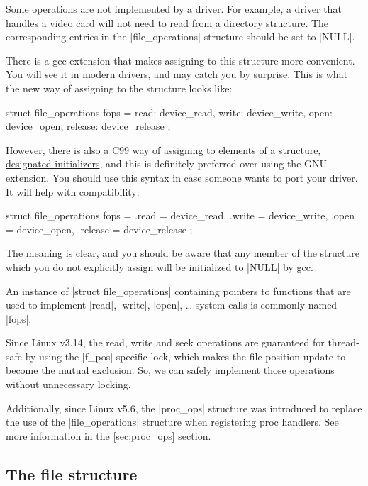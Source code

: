 \documentclass[10pt, oneside]{book}
\begin{document}
Some operations are not implemented by a driver.
For example, a driver that handles a video card will not need to read from a directory structure.
The corresponding entries in the \cpp|file_operations| structure should be set to \cpp|NULL|.

There is a gcc extension that makes assigning to this structure more convenient.
You will see it in modern drivers, and may catch you by surprise.
This is what the new way of assigning to the structure looks like:

\begin{code}
struct file_operations fops = {
	read: device_read,
	write: device_write,
	open: device_open,
	release: device_release
};
\end{code}

However, there is also a C99 way of assigning to elements of a structure, \href{https://gcc.gnu.org/onlinedocs/gcc/Designated-Inits.html}{designated initializers}, and this is definitely preferred over using the GNU extension.
You should use this syntax in case someone wants to port your driver.
It will help with compatibility:

\begin{code}
struct file_operations fops = {
	.read = device_read,
	.write = device_write,
	.open = device_open,
	.release = device_release
};
\end{code}

The meaning is clear, and you should be aware that any member of the structure which you do not explicitly assign will be initialized to \cpp|NULL| by gcc.

An instance of \cpp|struct file_operations| containing pointers to functions that are used to implement \cpp|read|, \cpp|write|, \cpp|open|, \ldots{} system calls is commonly named \cpp|fops|.

Since Linux v3.14, the read, write and seek operations are guaranteed for thread-safe by using the \cpp|f_pos| specific lock, which makes the file position update to become the mutual exclusion.
So, we can safely implement those operations without unnecessary locking.

Additionally, since Linux v5.6, the \cpp|proc_ops| structure was introduced to replace the use of the \cpp|file_operations| structure when registering proc handlers.
See more information in the \ref{sec:proc_ops} section.

\subsection{The file structure}
\label{sec:file_struct}
\end{document}

